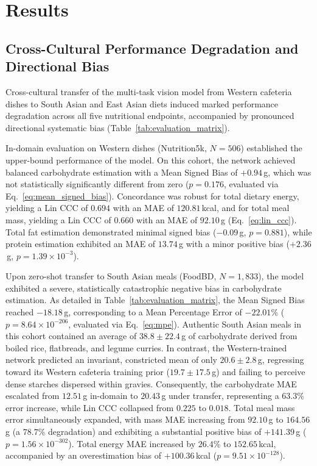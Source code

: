 \documentclass[utf8]{FrontiersinVancouver}
\begin{document}
\section{Results}

\subsection{Cross-Cultural Performance Degradation and Directional Bias}

Cross-cultural transfer of the multi-task vision model from Western cafeteria dishes to South Asian and East Asian diets induced marked performance degradation across all five nutritional endpoints, accompanied by pronounced directional systematic bias (Table~\ref{tab:evaluation_matrix}).

In-domain evaluation on Western dishes (Nutrition5k, $N=506$) established the upper-bound performance of the model. On this cohort, the network achieved balanced carbohydrate estimation with a Mean Signed Bias of $+0.94$\,g, which was not statistically significantly different from zero ($p = 0.176$, evaluated via Eq.~\ref{eq:mean_signed_bias}). Concordance was robust for total dietary energy, yielding a Lin CCC of $0.694$ with an MAE of $120.81$\,kcal, and for total meal mass, yielding a Lin CCC of $0.660$ with an MAE of $92.10$\,g (Eq.~\ref{eq:lin_ccc}). Total fat estimation demonstrated minimal signed bias ($-0.09$\,g, $p = 0.881$), while protein estimation exhibited an MAE of $13.74$\,g with a minor positive bias ($+2.36$\,g, $p = 1.39 \times 10^{-3}$).

Upon zero-shot transfer to South Asian meals (FoodBD, $N=1,833$), the model exhibited a severe, statistically catastrophic negative bias in carbohydrate estimation. As detailed in Table~\ref{tab:evaluation_matrix}, the Mean Signed Bias reached $-18.18$\,g, corresponding to a Mean Percentage Error of $-22.01\%$ ($p = 8.64 \times 10^{-206}$, evaluated via Eq.~\ref{eq:mpe}). Authentic South Asian meals in this cohort contained an average of $38.8 \pm 22.4$\,g of carbohydrate derived from boiled rice, flatbreads, and legume curries. In contrast, the Western-trained network predicted an invariant, constricted mean of only $20.6 \pm 2.8$\,g, regressing toward its Western cafeteria training prior ($19.7 \pm 17.5$\,g) and failing to perceive dense starches dispersed within gravies. Consequently, the carbohydrate MAE escalated from $12.51$\,g in-domain to $20.43$\,g under transfer, representing a $63.3\%$ error increase, while Lin CCC collapsed from $0.225$ to $0.018$. Total meal mass error simultaneously expanded, with mass MAE increasing from $92.10$\,g to $164.56$\,g (a $78.7\%$ degradation) and exhibiting a substantial positive bias of $+141.39$\,g ($p = 1.56 \times 10^{-302}$). Total energy MAE increased by $26.4\%$ to $152.65$\,kcal, accompanied by an overestimation bias of $+100.36$\,kcal ($p = 9.51 \times 10^{-128}$).
\end{document}
